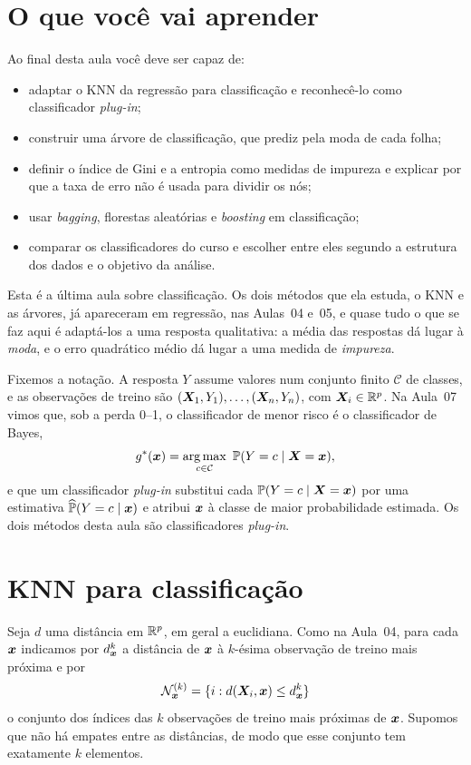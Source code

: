 \documentclass[11pt,a4paper]{article}
\title{}
\date{}
\begin{document}

\section*{O que você vai aprender}
Ao final desta aula você deve ser capaz de:
\begin{itemize}[leftmargin=1.4cm]
  \item adaptar o KNN da regressão para classificação e reconhecê-lo como
        classificador \emph{plug-in};
  \item construir uma árvore de classificação, que prediz pela moda de cada folha;
  \item definir o índice de Gini e a entropia como medidas de impureza e explicar
        por que a taxa de erro não é usada para dividir os nós;
  \item usar \emph{bagging}, florestas aleatórias e \emph{boosting} em
        classificação;
  \item comparar os classificadores do curso e escolher entre eles segundo a
        estrutura dos dados e o objetivo da análise.
\end{itemize}

\noindent
Esta é a última aula sobre classificação. Os dois métodos que ela estuda, o KNN e as
árvores, já apareceram em regressão, nas Aulas~04 e~05, e quase tudo o que se faz aqui
é adaptá-los a uma resposta qualitativa: a média das respostas dá lugar à
\emph{moda}, e o erro quadrático médio dá lugar a uma medida de \emph{impureza}.

Fixemos a notação. A resposta $Y$ assume valores num conjunto finito $\mathcal{C}$ de
classes, e as observações de treino são $(\bm{X}_1,Y_1),\dots,(\bm{X}_n,Y_n)$, com
$\bm{X}_i\in\mathbb{R}^p$. Na Aula~07 vimos que, sob a perda 0--1, o classificador de menor risco
é o classificador de Bayes,
\[
  g^*(\x)=\argmax_{c\in\mathcal{C}}\ \Prob(Y=c\mid\X=\x),
\]
e que um classificador \emph{plug-in} substitui cada $\mathbb{P}(Y=c\mid\bm{X}=\bm{x})$ por uma
estimativa $\widehat{\mathbb{P}}(Y=c\mid\bm{x})$ e atribui $\bm{x}$ à classe de maior probabilidade
estimada. Os dois métodos desta aula são classificadores \emph{plug-in}.

\section{KNN para classificação}
Seja $d$ uma distância em $\mathbb{R}^p$, em geral a euclidiana. Como na Aula~04, para cada
$\bm{x}$ indicamos por $d^k_{\bm{x}}$ a distância de $\bm{x}$ à $k$-ésima observação de treino
mais próxima e por
\[
  \mathcal{N}_{\bm{x}}^{(k)}=\{i : d(\bm{X}_i,\bm{x})\le d^k_{\bm{x}}\}
\]
o conjunto dos índices das $k$ observações de treino mais próximas de $\bm{x}$. Supomos
que não há empates entre as distâncias, de modo que esse conjunto tem exatamente $k$
elementos.
\end{document}

